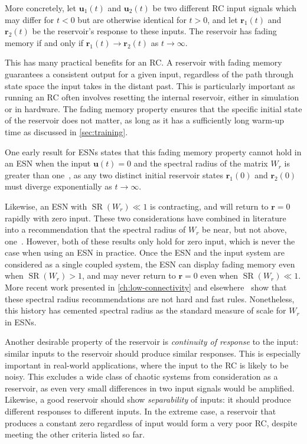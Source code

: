 More concretely, let $\bm{u}_1(t)$ and $\bm{u}_2(t)$ be two different
RC input signals which may differ for $t < 0$ but are otherwise
identical for $t > 0$, and let $\bm{r}_1(t)$ and $\bm{r}_2(t)$ be the
reservoir's response to these inputs. The reservoir has fading memory
if and only if $\bm{r}_1(t) \rightarrow \bm{r}_2(t)$ as $t \rightarrow \infty$.

This has many practical benefits for an RC. A reservoir with fading
memory guarantees a consistent output for a given input, regardless of
the path through state space the input takes in the distant past. This
is particularly important as running an RC often involves
resetting the internal reservoir, either in simulation or in
hardware. The fading memory property ensures that the specific initial
state of the reservoir does not matter, as long as it has a
sufficiently long warm-up time as discussed in \cref{sec:training}.

One early result for ESNs states that this fading memory property
cannot hold in an ESN when the input $\bm{u}(t) = 0$ and the spectral radius
of the matrix $W_r$ is greater than one~\cite{jaeger2001},
as any two distinct initial reservoir states
$\bm{r}_1(0)$ and $\bm{r}_2(0)$ must diverge exponentially as $t
\rightarrow \infty$.

Likewise, an ESN with $\operatorname{SR}(W_r) \ll 1$ is contracting,
and will return to $\bm{r} = 0$ rapidly with zero input. These two
considerations have combined in literature into a recommendation that
the spectral radius of $W_r$ be near, but not above,
one~\cite{lukosevicius2012}. However, both of these results only hold
for zero input, which is never the case when using an ESN in practice.
Once the ESN and the input system are considered as a single coupled
system, the ESN can display fading memory even when
$\operatorname{SR}(W_r) > 1$, and may never return to $\bm{r} = 0$
even when $\operatorname{SR}(W_r) \ll 1$.  More recent work presented
in \cref{ch:low-connectivity} and
elsewhere~\cite{pathak2017,rodan2011} show that these spectral radius
recommendations are not hard and fast rules. Nonetheless, this history
has cemented spectral radius as the standard measure of scale for
$W_r$ in ESNs.

Another desirable property of the reservoir is \emph{continuity of response} to the input:
similar inputs to the reservoir should produce
similar responses. This is especially important in real-world
applications, where the input to the RC is likely to be noisy. This
excludes a wide class of chaotic systems from consideration as a
reservoir, as even very small differences in two input signals would
be amplified. Likewise, a good reservoir should show \emph{separability} of inputs: it should produce different
responses to different inputs. In the extreme case, a reservoir that
produces a constant zero regardless of input would form a very poor RC,
despite meeting the other criteria listed so far.


